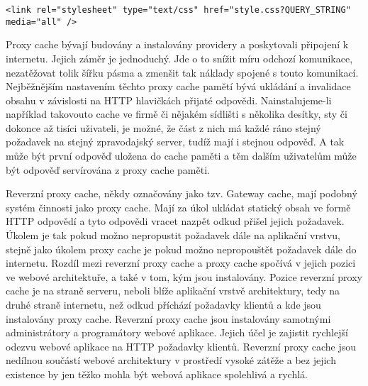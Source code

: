 \documentclass[12pt]{article}
\begin{document}
\begin{scriptsize}
\begin{verbatim}
<link rel="stylesheet" type="text/css" href="style.css?QUERY_STRING" media="all" />
\end{verbatim}
\end{scriptsize}

Proxy cache bývají budovány a instalovány providery a poskytovali připojení k internetu. Jejich záměr je jednoduchý. Jde o to snížit míru odchozí komunikace, nezatěžovat tolik šířku pásma a zmenšit tak náklady spojené s touto komunikací. Nejběžnějším nastavením těchto proxy cache pamětí bývá ukládání a invalidace obsahu v závislosti na HTTP hlavičkách přijaté odpovědi. Nainstalujeme-li například takovouto cache ve firmě či nějakém sídlišti s několika desítky, sty či dokonce až tisíci uživateli, je možné, že část z nich má každé ráno stejný požadavek na stejný zpravodajský server, tudíž mají i stejnou odpověď. A tak může být první odpověď uložena do cache paměti a těm dalším uživatelům může být odpověď servírována z proxy cache paměti.\cite{proxy-cache}

\obrazek
{}

\label{sec:reverse-proxy}
Reverzní proxy cache, někdy označovány jako tzv. Gateway cache, mají podobný systém činnosti jako proxy cache. Mají za úkol ukládat statický obsah ve formě HTTP odpovědí a tyto odpovědi vracet nazpět odkud přišel jejich požadavek. Úkolem je tak pokud možno nepropustit požadavek dále na aplikační vrstvu, stejně jako úkolem proxy cache je pokud možno nepropouštět požadavek dále do internetu. Rozdíl mezi reverzní proxy cache a proxy cache spočívá v jejich pozici ve webové architektuře, a také v tom, kým jsou instalovány. Pozice reverzní proxy cache je na straně serveru, neboli blíže aplikační vrstvě architektury, tedy na druhé straně internetu, než odkud příchází požadavky klientů a kde jsou instalovány proxy cache. Reverzní proxy cache jsou instalovány samotnými administrátory a programátory webové aplikace. Jejich účel je zajistit rychlejší odezvu webové aplikace na HTTP požadavky klientů. Reverzní proxy cache jsou nedílnou součástí webové architektury v prostředí vysoké zátěže a bez jejich existence by jen těžko mohla být webová aplikace spolehlivá a rychlá.\cite{proxy-cache}

\obrazek
{}
\end{document}
